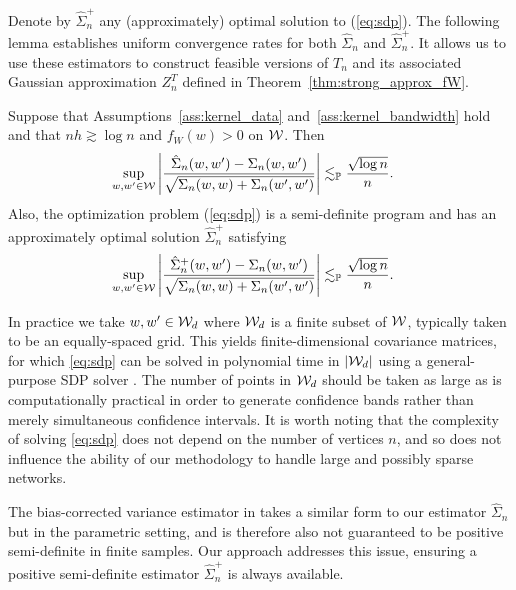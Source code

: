 Denote by $\hat\Sigma_n^+$ any (approximately) optimal solution to
(\ref{eq:sdp}). The following lemma establishes uniform convergence rates
for both $\hat \Sigma_n$ and $\hat \Sigma_n^+$. It allows us to use
these estimators to construct feasible versions of $T_n$ and its associated
Gaussian approximation $Z_n^{T}$ defined in Theorem~\ref{thm:strong_approx_fW}.
%
\begin{lemma}
  \label{lem:sdp}
  Suppose that Assumptions~\ref{ass:kernel_data}
  and~\ref{ass:kernel_bandwidth} hold
  and that
  $n h \gtrsim \log n$ and
  $f_W(w) > 0$ on $\mathcal{W}$.
  Then
  \begin{align*}
    \sup_{w,w' \in \mathcal{W}}
    \left|
    \frac{\hat \Sigma_n(w,w') - \Sigma_n(w,w')}
    {\sqrt{\Sigma_n(w,w) + \Sigma_n(w',w')}}
    \right|
    &\lesssim_{\mathbb{P}}
    \frac{\sqrt{\log n}}{n}.
  \end{align*}
  Also, the optimization problem (\ref{eq:sdp})
  is a semi-definite program
  \citep[SDP,][]{laurent2005semidefinite}
  and has an approximately
  optimal solution
  $\hat\Sigma_n^+$
  satisfying
  \begin{align*}
    \sup_{w,w' \in \mathcal{W}}
    \left|
    \frac{\hat \Sigma_n^+(w,w') - \Sigma_n(w,w')}
    {\sqrt{\Sigma_n(w,w) + \Sigma_n(w',w')}}
    \right|
    &\lesssim_{\mathbb{P}}
    \frac{\sqrt{\log n}}{n}.
  \end{align*}
\end{lemma}

In practice we take $w, w' \in \mathcal{W}_d$ where $\mathcal{W}_d$ is a finite
subset of $\mathcal{W}$, typically taken to be an equally-spaced grid.
This yields finite-dimensional covariance matrices,
for which \eqref{eq:sdp}
can be solved in polynomial time in $|\mathcal{W}_d|$ using
a general-purpose SDP solver
\citep[e.g.\ by interior point methods,][]{laurent2005semidefinite}.
The number of points in $\mathcal{W}_d$ should be taken as large as is
computationally practical in order to generate
confidence bands rather than merely simultaneous confidence intervals.
It is worth noting that the complexity of solving \eqref{eq:sdp}
does not depend on the number of vertices $n$,
and so does not influence the ability
of our methodology to handle large and possibly sparse networks.

The bias-corrected variance estimator in
\citet[Section~3.2]{MatsushitaOtsu2021} takes a similar form
to our estimator $\hat\Sigma_n$ but in the parametric setting,
and is therefore also not guaranteed
to be positive semi-definite in finite samples.
Our approach addresses this issue,
ensuring a positive semi-definite estimator
$\hat\Sigma_n^+$ is always available.

